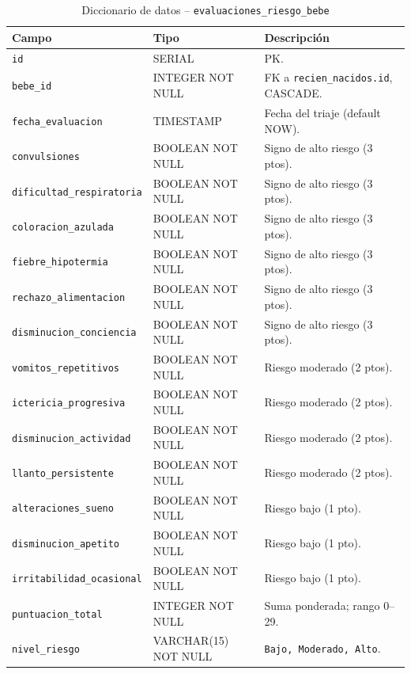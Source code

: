 \documentclass[12pt,letterpaper]{article}
\begin{document}
\begin{longtable}{p{}p{}p{}}
\caption{Diccionario de datos -- \texttt{evaluaciones\_riesgo\_bebe}}\\\toprule
\textbf{Campo} & \textbf{Tipo} & \textbf{Descripción} \\\midrule
\endhead
\texttt{id} & SERIAL & PK.\\\hline
\texttt{bebe\_id} & INTEGER NOT NULL & FK a \texttt{recien\_nacidos.id}, CASCADE.\\\hline
\texttt{fecha\_evaluacion} & TIMESTAMP & Fecha del triaje (default NOW).\\\hline
\texttt{convulsiones} & BOOLEAN NOT NULL & Signo de alto riesgo (3 ptos).\\\hline
\texttt{dificultad\_respiratoria} & BOOLEAN NOT NULL & Signo de alto riesgo (3 ptos).\\\hline
\texttt{coloracion\_azulada} & BOOLEAN NOT NULL & Signo de alto riesgo (3 ptos).\\\hline
\texttt{fiebre\_hipotermia} & BOOLEAN NOT NULL & Signo de alto riesgo (3 ptos).\\\hline
\texttt{rechazo\_alimentacion} & BOOLEAN NOT NULL & Signo de alto riesgo (3 ptos).\\\hline
\texttt{disminucion\_conciencia} & BOOLEAN NOT NULL & Signo de alto riesgo (3 ptos).\\\hline
\texttt{vomitos\_repetitivos} & BOOLEAN NOT NULL & Riesgo moderado (2 ptos).\\\hline
\texttt{ictericia\_progresiva} & BOOLEAN NOT NULL & Riesgo moderado (2 ptos).\\\hline
\texttt{disminucion\_actividad} & BOOLEAN NOT NULL & Riesgo moderado (2 ptos).\\\hline
\texttt{llanto\_persistente} & BOOLEAN NOT NULL & Riesgo moderado (2 ptos).\\\hline
\texttt{alteraciones\_sueno} & BOOLEAN NOT NULL & Riesgo bajo (1 pto).\\\hline
\texttt{disminucion\_apetito} & BOOLEAN NOT NULL & Riesgo bajo (1 pto).\\\hline
\texttt{irritabilidad\_ocasional} & BOOLEAN NOT NULL & Riesgo bajo (1 pto).\\\hline
\texttt{puntuacion\_total} & INTEGER NOT NULL & Suma ponderada; rango 0--29.\\\hline
\texttt{nivel\_riesgo} & VARCHAR(15) NOT NULL & \texttt{Bajo, Moderado, Alto}.\\\bottomrule
\end{longtable}
\end{document}
